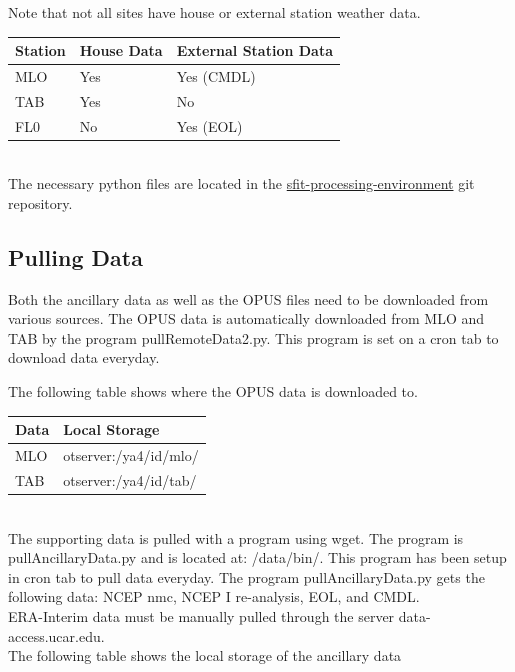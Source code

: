 \documentclass[12pt, letterpaper]{article}
\begin{document}
Note that not all sites have house or external station weather data.\\

\begin{tabular}{ l l l }
\textbf{Station} & \textbf{House Data} & \textbf{External Station Data} \\
\hline
MLO   & Yes & Yes (CMDL) \\
TAB   & Yes & No         \\
FL0   & No  & Yes (EOL)  \\
\end{tabular} \\

The necessary python files are located in the \href{https://git.ucar.edu/?p=sfit-processing-environment.git}{sfit-processing-environment} git repository. \\

\subsection{Pulling Data}
\label{sec:PD}
Both the ancillary data as well as the OPUS files need to be downloaded from various sources. The OPUS data is automatically downloaded from MLO and TAB by the program pullRemoteData2.py. This program is set on a cron tab to download data everyday.

The following table shows where the OPUS data is downloaded to.\\

\begin{tabular}{ l l }
\textbf{Data} & \textbf{Local Storage} \\
\hline
MLO   & otserver:/ya4/id/mlo/   \\
TAB   & otserver:/ya4/id/tab/   \\
\end{tabular} \\

The supporting data is pulled with a program using wget. The program is pullAncillaryData.py and is located at: /data/bin/. This program has been setup in cron tab to pull data everyday. The program pullAncillaryData.py gets the following data: NCEP nmc, NCEP I re-analysis, EOL, and CMDL. \\

ERA-Interim data must be manually pulled through the server data-access.ucar.edu.\\

The following table shows the local storage of the ancillary data\\
\end{document}
